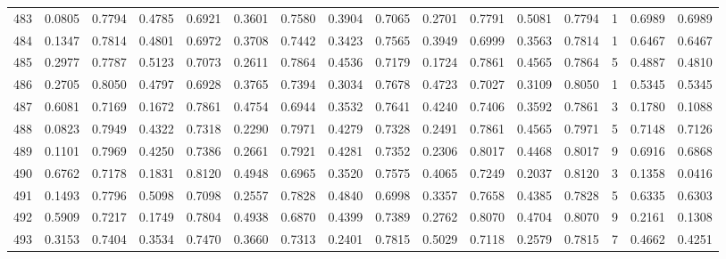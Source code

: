 \begin{tabular}{lrrrrrrrrrrrrrrr}
483 &      0.0805 &  0.7794 &  0.4785 &  0.6921 &  0.3601 &  0.7580 &  0.3904 &  0.7065 &  0.2701 &  0.7791 &   0.5081 &     0.7794 &      1 &                    0.6989 &                     0.6989 \\
484 &      0.1347 &  0.7814 &  0.4801 &  0.6972 &  0.3708 &  0.7442 &  0.3423 &  0.7565 &  0.3949 &  0.6999 &   0.3563 &     0.7814 &      1 &                    0.6467 &                     0.6467 \\
485 &      0.2977 &  0.7787 &  0.5123 &  0.7073 &  0.2611 &  0.7864 &  0.4536 &  0.7179 &  0.1724 &  0.7861 &   0.4565 &     0.7864 &      5 &                    0.4887 &                     0.4810 \\
486 &      0.2705 &  0.8050 &  0.4797 &  0.6928 &  0.3765 &  0.7394 &  0.3034 &  0.7678 &  0.4723 &  0.7027 &   0.3109 &     0.8050 &      1 &                    0.5345 &                     0.5345 \\
487 &      0.6081 &  0.7169 &  0.1672 &  0.7861 &  0.4754 &  0.6944 &  0.3532 &  0.7641 &  0.4240 &  0.7406 &   0.3592 &     0.7861 &      3 &                    0.1780 &                     0.1088 \\
488 &      0.0823 &  0.7949 &  0.4322 &  0.7318 &  0.2290 &  0.7971 &  0.4279 &  0.7328 &  0.2491 &  0.7861 &   0.4565 &     0.7971 &      5 &                    0.7148 &                     0.7126 \\
489 &      0.1101 &  0.7969 &  0.4250 &  0.7386 &  0.2661 &  0.7921 &  0.4281 &  0.7352 &  0.2306 &  0.8017 &   0.4468 &     0.8017 &      9 &                    0.6916 &                     0.6868 \\
490 &      0.6762 &  0.7178 &  0.1831 &  0.8120 &  0.4948 &  0.6965 &  0.3520 &  0.7575 &  0.4065 &  0.7249 &   0.2037 &     0.8120 &      3 &                    0.1358 &                     0.0416 \\
491 &      0.1493 &  0.7796 &  0.5098 &  0.7098 &  0.2557 &  0.7828 &  0.4840 &  0.6998 &  0.3357 &  0.7658 &   0.4385 &     0.7828 &      5 &                    0.6335 &                     0.6303 \\
492 &      0.5909 &  0.7217 &  0.1749 &  0.7804 &  0.4938 &  0.6870 &  0.4399 &  0.7389 &  0.2762 &  0.8070 &   0.4704 &     0.8070 &      9 &                    0.2161 &                     0.1308 \\
493 &      0.3153 &  0.7404 &  0.3534 &  0.7470 &  0.3660 &  0.7313 &  0.2401 &  0.7815 &  0.5029 &  0.7118 &   0.2579 &     0.7815 &      7 &                    0.4662 &                     0.4251 \\

\end{tabular}
